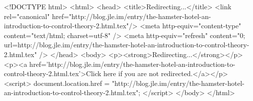 <!DOCTYPE html>
<html>
<head>
<title>Redirecting...</title>
<link rel="canonical" href="http://blog.jle.im/entry/the-hamster-hotel-an-introduction-to-control-theory-2.html.tex"/>
<meta http-equiv="content-type" content="text/html; charset=utf-8" />
<meta http-equiv="refresh" content="0; url=http://blog.jle.im/entry/the-hamster-hotel-an-introduction-to-control-theory-2.html.tex" />
</head>
<body>
  <p><strong>Redirecting...</strong></p>
  <p><a href='http://blog.jle.im/entry/the-hamster-hotel-an-introduction-to-control-theory-2.html.tex'>Click here if you are not redirected.</a></p>
  <script>
    document.location.href = "http://blog.jle.im/entry/the-hamster-hotel-an-introduction-to-control-theory-2.html.tex";
  </script>
</body>
</html>
